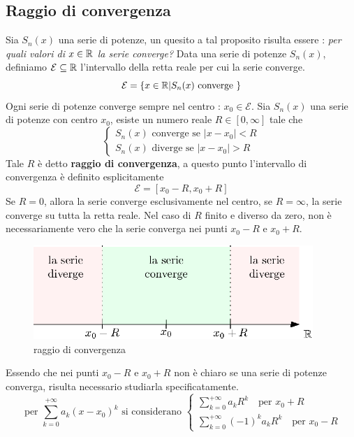 \documentclass[10pt, letterpaper]{report}
\begin{document}
\subsection{Raggio di convergenza}
Sia $S_n(x)$ una serie di potenze, un quesito a tal proposito risulta essere : \textit{per quali 
valori di $x\in{\mathbb R}$ la serie converge?} Data una serie di 
potenze $S_n(x)$, definiamo $\mathcal{E}\subseteq {\mathbb R}$ l'intervallo della retta reale 
per cui la serie converge. 
$$ \mathcal{E}=\{x\in{\mathbb R} | S_n(x) \text{ converge }\}$$
\prop{} Ogni serie di potenze converge sempre nel centro : $x_0\in\mathcal{E}$.\acc 
{} Sia $S_n(x)$ una serie di potenze con centro $x_0$, esiste un numero reale 
$R\in[0,\infty]$ tale che $$\begin{cases}
    S_n(x) \text{ converge se }|x-x_0|<R\\
    S_n(x) \text{ diverge se }|x-x_0|>R
\end{cases}$$
Tale $R$ è detto \textbf{raggio di convergenza}, a questo punto l'intervallo di convergenza è 
definito esplicitamente $$\mathcal{E}=[x_0-R,x_0+R]$$
Se $R=0$, allora la serie converge esclusivamente nel centro, se $R=\infty$, la serie converge 
su tutta la retta reale. Nel caso di $R$ finito e diverso da zero, non è necessariamente vero 
che la serie converga nei punti $x_0-R$ e $x_0+R$.
\begin{figure}[h!]
    \centering
    \includegraphics[width=300pt]{images/raggioConvergenza.eps}
    \caption{raggio di convergenza}
\end{figure}\acc
Essendo che nei punti $x_0-R$ e $x_0+R$ non è chiaro se una serie di potenze converga, risulta 
necessario studiarla specificatamente.
$$ 
 \text{ per }\sum_{k=0}^{+\infty}a_k(x-x_0)^k \text{ si considerano }  \begin{cases}
    \displaystyle \sum_{k=0}^{+\infty}a_kR^k \text{  }\text{ per }x_0+R  \\
   \displaystyle \sum_{k=0}^{+\infty}(-1)^ka_kR^k \text{  }\text{ per }x_0-R
 \end{cases}
$$
\end{document}
